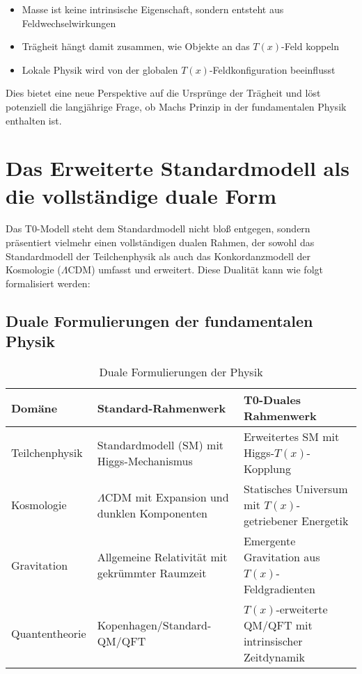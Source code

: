 \documentclass[12pt,a4paper]{article}
\newcommand{\Tfield}{T(x)}
\begin{document}
	\begin{itemize}
		\item Masse ist keine intrinsische Eigenschaft, sondern entsteht aus Feldwechselwirkungen
		\item Trägheit hängt damit zusammen, wie Objekte an das $\Tfield$-Feld koppeln
		\item Lokale Physik wird von der globalen $\Tfield$-Feldkonfiguration beeinflusst
	\end{itemize}
	
	Dies bietet eine neue Perspektive auf die Ursprünge der Trägheit und löst potenziell die langjährige Frage, ob Machs Prinzip in der fundamentalen Physik enthalten ist.
	
	\section{Das Erweiterte Standardmodell als die vollständige duale Form}
	
	Das T0-Modell steht dem Standardmodell nicht bloß entgegen, sondern präsentiert vielmehr einen vollständigen dualen Rahmen, der sowohl das Standardmodell der Teilchenphysik als auch das Konkordanzmodell der Kosmologie ($\Lambda$CDM) umfasst und erweitert. Diese Dualität kann wie folgt formalisiert werden:
	
	\subsection{Duale Formulierungen der fundamentalen Physik}
	
	\begin{table}[h]
		\centering
		\begin{tabular}{>{\RaggedRight}p{} >{\RaggedRight}p{} >{\RaggedRight}p{}}
			\toprule
			\textbf{Domäne} & \textbf{Standard-Rahmenwerk} & \textbf{T0-Duales Rahmenwerk} \\
			\midrule
			Teilchenphysik & Standardmodell (SM) mit Higgs-Mechanismus & Erweitertes SM mit Higgs-$\Tfield$-Kopplung \\
			Kosmologie & $\Lambda$CDM mit Expansion und dunklen Komponenten & Statisches Universum mit $\Tfield$-getriebener Energetik \\
			Gravitation & Allgemeine Relativität mit gekrümmter Raumzeit & Emergente Gravitation aus $\Tfield$-Feldgradienten \\
			Quantentheorie & Kopenhagen/Standard-QM/QFT & $\Tfield$-erweiterte QM/QFT mit intrinsischer Zeitdynamik \\
			\bottomrule
		\end{tabular}
		\caption{Duale Formulierungen der Physik}
	\end{table}
	
\end{document}
